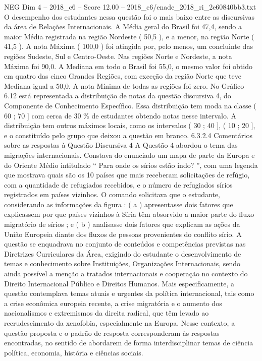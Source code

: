 \begin{textsample}{NEG Dim 4 – 2018\_c6 – Score 12.00 – 2018\_c6/enade\_2018\_ri\_2e60840bb3.txt}
O desempenho dos estudantes nessa questão foi o mais baixo entre as discursivas da área de Relações Internacionais.
A Média geral do Brasil foi 47,4, sendo a maior Média registrada na região Nordeste ( 50,5 ), e a menor, na região Norte ( 41,5 ).
A nota Máxima ( 100,0 ) foi atingida por, pelo menos, um concluinte das regiões Sudeste, Sul e Centro-Oeste.
Nas regiões Norte e Nordeste, a nota Máxima foi 90,0.
A Mediana em todo o Brasil foi 55,0, o mesmo valor foi obtido em quatro das cinco Grandes Regiões, com exceção da região Norte que teve Mediana igual a 50,0.
A nota Mínima de todas as regiões foi zero.
No Gráfico 6.12 está representada a distribuição de notas da questão discursiva 4, do Componente de Conhecimento Específico.
Essa distribuição tem moda na classe ( 60 ; 70 ] com cerca de 30 \% de estudantes obtendo notas nesse intervalo.
A distribuição tem outros máximos locais, como os intervalos ( 30 ; 40 ], ( 10 ; 20 ], e o constituído pelo grupo que deixou a questão em branco. 6.3.2.4 Comentários sobre as respostas à Questão Discursiva 4 A Questão 4 abordou o tema das migrações internacionais.
Constava do enunciado um mapa de parte da Europa e do Oriente Médio intitulado “ Para onde os sírios estão indo? ”, com uma legenda que mostrava quais são os 10 países que mais receberam solicitações de refúgio, com a quantidade de refugiados recebidos, e o número de refugiados sírios registrados em países vizinhos.
O comando solicitava que o estudante, considerando as informações da figura : ( a ) apresentasse dois fatores que explicassem por que países vizinhos à Síria têm absorvido a maior parte do fluxo migratório de sírios ; e ( b ) analisasse dois fatores que explicam as ações da União Europeia diante dos fluxos de pessoas provenientes do conflito sírio.
A questão se enquadrava no conjunto de conteúdos e competências previstas nas Diretrizes Curriculares da Área, exigindo do estudante o desenvolvimento de temas e conhecimento sobre Instituições, Organizações Internacionais, sendo ainda possível a menção a tratados internacionais e cooperação no contexto do Direito Internacional Público e Direitos Humanos.
Mais especificamente, a questão contemplava temas atuais e urgentes da política internacional, tais como a crise econômica europeia recente, a crise migratória e o aumento dos nacionalismos e extremismos da direita radical, que têm levado ao recrudescimento da xenofobia, especialmente na Europa.
Nesse contexto, a questão proposta e o padrão de resposta corresponderam às respostas encontradas, no sentido de abordarem de forma interdisciplinar temas de ciência política, economia, história e ciências sociais.

\end{textsample}
